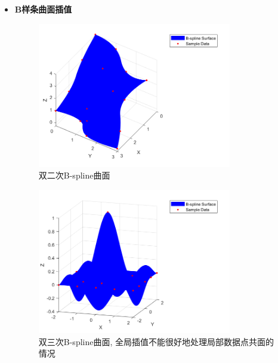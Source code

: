 \documentclass[utf8]{ctexart}
\begin{document}
\begin{itemize}
\begin{figure}[H]
        \label{fig: bezierSurfInterp2}
    \end{figure}
    \item \textbf{B样条曲面插值}\\
    \begin{figure}[H]
        \centering
        \includegraphics[width=0.8\textwidth]{bsplineSurfInterp.png}
        \caption{双二次B-spline曲面}
        \label{fig: bsplineSurfInterp}
    \end{figure}
    \begin{figure}[H]
        \centering
        \includegraphics[width=0.8\textwidth]{bsplineSurfInterp2.png}
        \caption{双三次B-spline曲面, 全局插值不能很好地处理局部数据点共面的情况}
        \label{fig: bsplineSurfInterp2}
    \end{figure}
\end{itemize}
\end{document}
